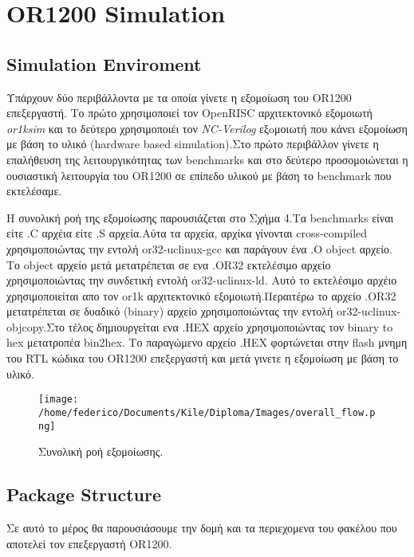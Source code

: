 \documentclass[a4paper,10pt]{article}
\begin{document}
\section{OR1200 Simulation}{

\subsection{Simulation Enviroment}{
Υπάρχουν δύο περιβάλλοντα με τα οποία γίνετε η εξομοίωση του OR1200 επεξεργαστή.
Το πρώτο χρησιμοποιεί τον OpenRISC αρχιτεκτονικό εξομοιωτή \emph{or1ksim} και 
το δεύτερο χρησιμοποιέι τον \emph{NC-Verilog} εξoμοιωτή που κάνει εξομοίωση με βάση
το υλικό (hardware based simulation).Στο πρώτο περιβάλλον γίνετε η επαλήθευση
της λειτουργικότητας των benchmarks και στο δεύτερο προσομοιώνεται η ουσιαστική
λειτουργία του OR1200 σε επίπεδο υλικού με βάση το benchmark που εκτελέσαμε.\newline


Η συνολική ροή της εξομοίωσης παρουσιάζεται στο Σχήμα 4.Τα benchmarks είναι 
είτε .C αρχέια είτε .S αρχεία.Αύτα τα αρχεία, αρχίκα γίνονται cross-compiled
 χρησιμοποιώντας την εντολή or32-uclinux-gcc και παράγουν ένα .O object αρχείο.
Το object αρχείο μετά μετατρέπεται σε ενα .OR32 εκτελέσιμο αρχείο χρησιμοποιώντας
την συνδετική εντολή or32-uclinux-ld. Αυτό το εκτελέσιμο αρχέιο χρησιμοποιείται
απο τον or1k αρχιτεκτονικό εξομοιωτή.Περαιτέρω το αρχείο .OR32 μετατρέπεται σε
δυαδικό (binary) αρχείο χρησιμοποιώντας την εντολή or32-uclinux-objcopy.Στο τέλος
δημιουργείται ενα .HEX αρχείο χρησιμοποιώντας τον binary to hex μετατροπέα
 bin2hex. Το παραγώμενο αρχείο .HEX φορτώνεται στην flash μνημη του RTL κώδικα
του OR1200 επεξεργαστή και μετά γινετε η εξομοίωση με βάση το υλικό.
 
\begin{figure}[h!]
 \centering
 \texttt{[image: /home/federico/Documents/Kile/Diploma/Images/overall\_flow.png]}
 \caption{Συνολική ροή εξομοίωσης.}
\end{figure}


}



\subsection{Package Structure}{
Σε αυτό το μέρος θα παρουσιάσουμε την δομή και τα περιεχομενα του φακέλου που αποτελεί 
τον επεξεργαστή OR1200.

}}
\end{document}
